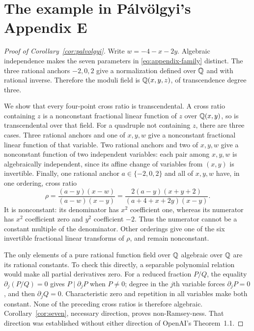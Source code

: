 \section{The example in P\'alv\"olgyi's Appendix E}\label{sec:appendix-example}

\begin{proof}[Proof of Corollary~\ref{cor:palvolgyi}]
Write $w=-4-x-2y$. Algebraic independence makes the seven parameters
in \eqref{eq:appendix-family} distinct. The three rational anchors
$-2,0,2$ give a normalization defined over $\mathbb Q$ and with rational
inverse. Therefore the moduli field is $\mathbb Q(x,y,z)$, of
transcendence degree three.

We show that every four-point cross ratio is transcendental.
A cross ratio containing $z$ is a nonconstant fractional linear
function of $z$ over $\mathbb Q(x,y)$, so is transcendental over that field.
For a quadruple not containing $z$, there are three cases. Three
rational anchors and one of $x,y,w$ give a nonconstant fractional
linear function of that variable. Two rational anchors and two of
$x,y,w$ give a nonconstant function of two independent variables:
each pair among $x,y,w$ is algebraically independent, since its
affine change of variables from $(x,y)$ is invertible. Finally,
one rational anchor $a\in\{-2,0,2\}$ and all of $x,y,w$ have,
in one ordering, cross ratio
\begin{equation}\label{eq:appendix-cross}
 \rho=\frac{(a-y)(x-w)}{(a-w)(x-y)}
      =\frac{2(a-y)(x+y+2)}{(a+4+x+2y)(x-y)}.
\end{equation}
It is nonconstant: its denominator has $x^2$ coefficient one,
whereas its numerator has $x^2$ coefficient zero and $y^2$
coefficient $-2$. Thus the numerator cannot be a constant multiple
of the denominator. Other orderings give one of the six invertible
fractional linear transforms of $\rho$, and remain nonconstant.

The only elements of a pure rational function field over $\mathbb Q$
algebraic over $\mathbb Q$ are its rational constants. To check this
directly, a separable polynomial relation would make all partial
derivatives zero. For a reduced fraction $P/Q$, the equality
$\partial_j(P/Q)=0$ gives $P\mid\partial_jP$ when $P\ne0$;
degree in the $j$th variable forces $\partial_jP=0$, and then
$\partial_jQ=0$. Characteristic zero and repetition in all variables
make both constant. None of the preceding cross ratios is therefore
algebraic. Corollary~\ref{cor:seven}, necessary direction, proves
non-Ramsey-ness. That direction was established without either
direction of OpenAI's Theorem~1.1.
\end{proof}

